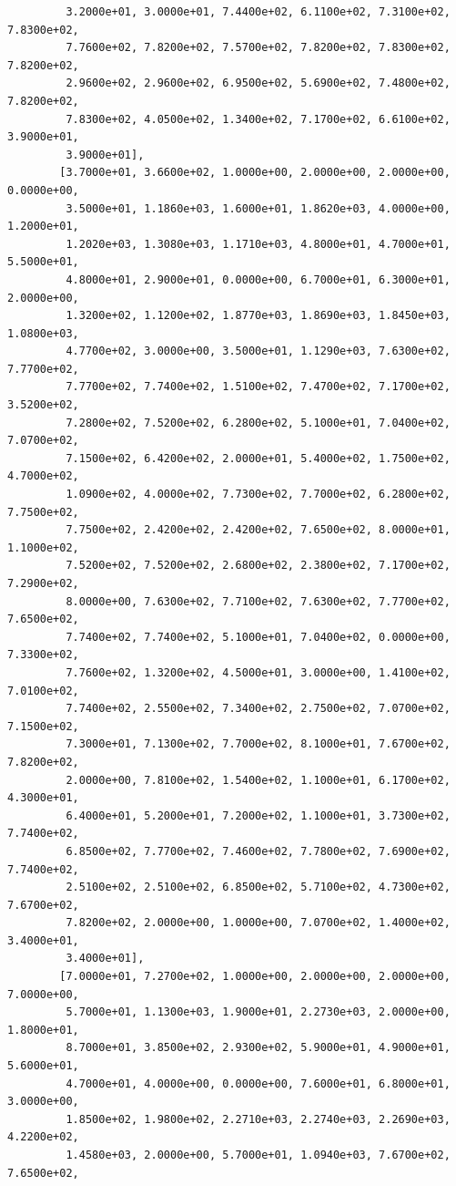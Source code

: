 \documentclass[
  letterpaper,
  DIV=11,
  numbers=noendperiod]{scrreprt}
\begin{document}
\begin{tcolorbox}
\begin{verbatim}
         3.2000e+01, 3.0000e+01, 7.4400e+02, 6.1100e+02, 7.3100e+02, 7.8300e+02,
         7.7600e+02, 7.8200e+02, 7.5700e+02, 7.8200e+02, 7.8300e+02, 7.8200e+02,
         2.9600e+02, 2.9600e+02, 6.9500e+02, 5.6900e+02, 7.4800e+02, 7.8200e+02,
         7.8300e+02, 4.0500e+02, 1.3400e+02, 7.1700e+02, 6.6100e+02, 3.9000e+01,
         3.9000e+01],
        [3.7000e+01, 3.6600e+02, 1.0000e+00, 2.0000e+00, 2.0000e+00, 0.0000e+00,
         3.5000e+01, 1.1860e+03, 1.6000e+01, 1.8620e+03, 4.0000e+00, 1.2000e+01,
         1.2020e+03, 1.3080e+03, 1.1710e+03, 4.8000e+01, 4.7000e+01, 5.5000e+01,
         4.8000e+01, 2.9000e+01, 0.0000e+00, 6.7000e+01, 6.3000e+01, 2.0000e+00,
         1.3200e+02, 1.1200e+02, 1.8770e+03, 1.8690e+03, 1.8450e+03, 1.0800e+03,
         4.7700e+02, 3.0000e+00, 3.5000e+01, 1.1290e+03, 7.6300e+02, 7.7700e+02,
         7.7700e+02, 7.7400e+02, 1.5100e+02, 7.4700e+02, 7.1700e+02, 3.5200e+02,
         7.2800e+02, 7.5200e+02, 6.2800e+02, 5.1000e+01, 7.0400e+02, 7.0700e+02,
         7.1500e+02, 6.4200e+02, 2.0000e+01, 5.4000e+02, 1.7500e+02, 4.7000e+02,
         1.0900e+02, 4.0000e+02, 7.7300e+02, 7.7000e+02, 6.2800e+02, 7.7500e+02,
         7.7500e+02, 2.4200e+02, 2.4200e+02, 7.6500e+02, 8.0000e+01, 1.1000e+02,
         7.5200e+02, 7.5200e+02, 2.6800e+02, 2.3800e+02, 7.1700e+02, 7.2900e+02,
         8.0000e+00, 7.6300e+02, 7.7100e+02, 7.6300e+02, 7.7700e+02, 7.6500e+02,
         7.7400e+02, 7.7400e+02, 5.1000e+01, 7.0400e+02, 0.0000e+00, 7.3300e+02,
         7.7600e+02, 1.3200e+02, 4.5000e+01, 3.0000e+00, 1.4100e+02, 7.0100e+02,
         7.7400e+02, 2.5500e+02, 7.3400e+02, 2.7500e+02, 7.0700e+02, 7.1500e+02,
         7.3000e+01, 7.1300e+02, 7.7000e+02, 8.1000e+01, 7.6700e+02, 7.8200e+02,
         2.0000e+00, 7.8100e+02, 1.5400e+02, 1.1000e+01, 6.1700e+02, 4.3000e+01,
         6.4000e+01, 5.2000e+01, 7.2000e+02, 1.1000e+01, 3.7300e+02, 7.7400e+02,
         6.8500e+02, 7.7700e+02, 7.4600e+02, 7.7800e+02, 7.6900e+02, 7.7400e+02,
         2.5100e+02, 2.5100e+02, 6.8500e+02, 5.7100e+02, 4.7300e+02, 7.6700e+02,
         7.8200e+02, 2.0000e+00, 1.0000e+00, 7.0700e+02, 1.4000e+02, 3.4000e+01,
         3.4000e+01],
        [7.0000e+01, 7.2700e+02, 1.0000e+00, 2.0000e+00, 2.0000e+00, 7.0000e+00,
         5.7000e+01, 1.1300e+03, 1.9000e+01, 2.2730e+03, 2.0000e+00, 1.8000e+01,
         8.7000e+01, 3.8500e+02, 2.9300e+02, 5.9000e+01, 4.9000e+01, 5.6000e+01,
         4.7000e+01, 4.0000e+00, 0.0000e+00, 7.6000e+01, 6.8000e+01, 3.0000e+00,
         1.8500e+02, 1.9800e+02, 2.2710e+03, 2.2740e+03, 2.2690e+03, 4.2200e+02,
         1.4580e+03, 2.0000e+00, 5.7000e+01, 1.0940e+03, 7.6700e+02, 7.6500e+02,

\end{verbatim}
\end{tcolorbox}
\end{document}
